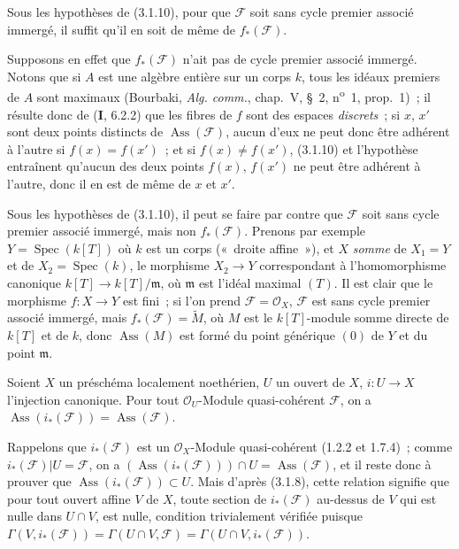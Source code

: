 \begin{corollary}[3.1.11]
\label{IV.2.3.1.11-fr}
Sous les hypothèses de \textup{(3.1.10)}, pour que $\mathcal F$ soit sans cycle premier
associé immergé, il suffit qu'il en soit de même de $f_*(\mathcal F)$.
\end{corollary}

Supposons en effet que $f_*(\mathcal F)$ n'ait pas de cycle premier associé
immergé. Notons que si $A$ est une algèbre entière sur un corps $k$, tous les
idéaux premiers de $A$ sont maximaux (Bourbaki, \emph{Alg. comm.}, chap.~V,
\S~2, n\textsuperscript{o}~1, prop.~1)~; il résulte donc de (\textbf{I}, 6.2.2) que les
fibres de $f$ sont des espaces \emph{discrets}~; si $x$, $x'$ sont deux points
distincts de $\operatorname{Ass}(\mathcal F)$, aucun d'eux ne peut donc être
adhérent à l'autre si $f(x)=f(x')$~; et si $f(x)\ne f(x')$, (3.1.10) et
l'hypothèse entraînent qu'aucun des deux points $f(x)$, $f(x')$ ne peut être
adhérent à l'autre, donc il en est de même de $x$ et $x'$.

\begin{remark}[3.1.12]
\label{IV.2.3.1.12-fr}
Sous les hypothèses de (3.1.10), il peut se faire par contre que $\mathcal F$
soit sans cycle premier associé immergé, mais non $f_*(\mathcal F)$. Prenons
par exemple $Y=\operatorname{Spec}(k[T])$ où $k$ est un corps («~droite
affine~»), et $X$ \emph{somme} de $X_1=Y$ et de $X_2=\operatorname{Spec}(k)$, le
morphisme $X_2\to Y$ correspondant à l'homomorphisme canonique
$k[T]\to k[T]/\mathfrak m$, où $\mathfrak m$ est l'idéal maximal $(T)$. Il
est clair que le morphisme $f:X\to Y$ est fini~; si l'on prend
$\mathcal F=\mathcal O_X$, $\mathcal F$ est sans cycle premier associé
immergé, mais $f_*(\mathcal F)=\widetilde M$, où $M$ est le $k[T]$-module
somme directe de $k[T]$ et de $k$, donc $\operatorname{Ass}(M)$ est formé du
point générique $(0)$ de $Y$ et du point $\mathfrak m$.
\end{remark}

\begin{proposition}[3.1.13]
\label{IV.2.3.1.13-fr}
Soient $X$ un préschéma localement noethérien, $U$ un ouvert de $X$,
$i:U\to X$ l'injection canonique. Pour tout $\mathcal O_U$-Module
quasi-cohérent $\mathcal F$, on a
$\operatorname{Ass}(i_*(\mathcal F))=\operatorname{Ass}(\mathcal F)$.
\end{proposition}

Rappelons que $i_*(\mathcal F)$ est un $\mathcal O_X$-Module quasi-cohérent
(1.2.2 et 1.7.4)~; comme $i_*(\mathcal F)|U=\mathcal F$, on a
$(\operatorname{Ass}(i_*(\mathcal F)))\cap U=\operatorname{Ass}(\mathcal F)$,
et il reste donc à prouver que $\operatorname{Ass}(i_*(\mathcal F))\subset U$.
Mais d'après (3.1.8), cette relation signifie que pour tout ouvert affine $V$
de $X$, toute section de $i_*(\mathcal F)$ au-dessus de $V$ qui est nulle
dans $U\cap V$, est nulle, condition trivialement vérifiée puisque
$\Gamma(V,i_*(\mathcal F))=\Gamma(U\cap V,\mathcal F)
=\Gamma(U\cap V,i_*(\mathcal F))$.

